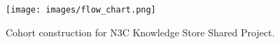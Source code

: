 \documentclass[11pt]{article}
\theoremstyle{plain}
\theoremstyle{definition}
\theoremstyle{remark}
\newcommand{\0}{\mathbf{0}}
\begin{document}
\begin{figure}[h!]
    \centering
    \texttt{[image: images/flow\_chart.png]}
    \caption{Cohort construction for N3C Knowledge Store Shared Project.}
    \label{fig:figure6}
\end{figure}

\end{document}

